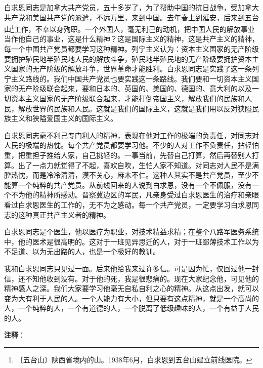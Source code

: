 \documentclass[12pt,UTF-8,openany]{ctexbook}
\begin{document}
\begin{large}
    
    白求恩同志是加拿大共产党员，五十多岁了，为了帮助中国的抗日战争，受加拿大共产党和美国共产党的派遣，不远万里，来到中国。去年春上到延安，后来到五台山\footnote{〔五台山〕陕西省境内的山。1938年6月，白求恩到五台山建立前线医院。}工作，不幸以身殉职。一个外国人，毫无利己的动机，把中国人民的解放事业当作他自己的事业，这是什么精神？这是国际主义的精神，这是共产主义的精神，每一个中国共产党员都要学习这种精神。列宁主义认为：资本主义国家的无产阶级要拥护殖民地半殖民地人民的解放斗争，殖民地半殖民地的无产阶级要拥护资本主义国家的无产阶级的解放斗争，世界革命才能胜利。白求恩同志是实践了这一条列宁主义路线的。我们中国共产党员也要实践这一条路线。我们要和一切资本主义国家的无产阶级联合起来，要和日本的、英国的、美国的、德国的、意大利的以及一切资本主义国家的无产阶级联合起来，才能打倒帝国主义，解放我们的民族和人民，解放世界的民族和人民。这就是我们的国际主义，这就是我们用以反对狭隘民族主义和狭隘爱国主义的国际主义。
    
    白求恩同志毫不利己专门利人的精神，表现在他对工作的极端的负责任，对同志对人民的极端的热忱。每个共产党员都要学习他。不少的人对工作不负责任，拈轻怕重，把重担子推给人家，自己挑轻的。一事当前，先替自己打算，然后再替别人打算。出了一点力就觉得了不起，喜欢自吹，生怕人家不知道。对同志对人民不是满腔热忱，而是冷冷清清，漠不关心，麻木不仁。这种人其实不是共产党员，至少不能算一个纯粹的共产党员。从前线回来的人说到白求恩，没有一个不佩服，没有一个不为他的精神所感动。晋察冀边区的军民，凡亲身受过白求恩医生的治疗和亲眼看过白求恩医生的工作的，无不为之感动。每一个共产党员，一定要学习白求恩同志的这种真正共产主义者的精神。
    
    白求恩同志是个医生，他以医疗为职业，对技术精益求精；在整个八路军医务系统中，他的医术是很高明的。这对于一班见异思迁的人，对于一班鄙薄技术工作以为不足道、以为无出路的人，也是一个极好的教训。
    
    我和白求恩同志只见过一面。后来他给我来过许多信。可是因为忙，仅回过他一封信，还不知他收到没有。对于他的死，我是很悲痛的。现在大家纪念他，可见他的精神感人之深。我们大家要学习他毫无自私自利之心的精神。从这点出发，就可以变为大有利于人民的人。一个人能力有大小，但只要有这点精神，就是一个高尚的人，一个纯粹的人，一个有道德的人，一个脱离了低级趣味的人，一个有益于人民的人。
    
\end{large}


\newpage

\textbf{注释}：

\vspace{-1em}
\end{document}
